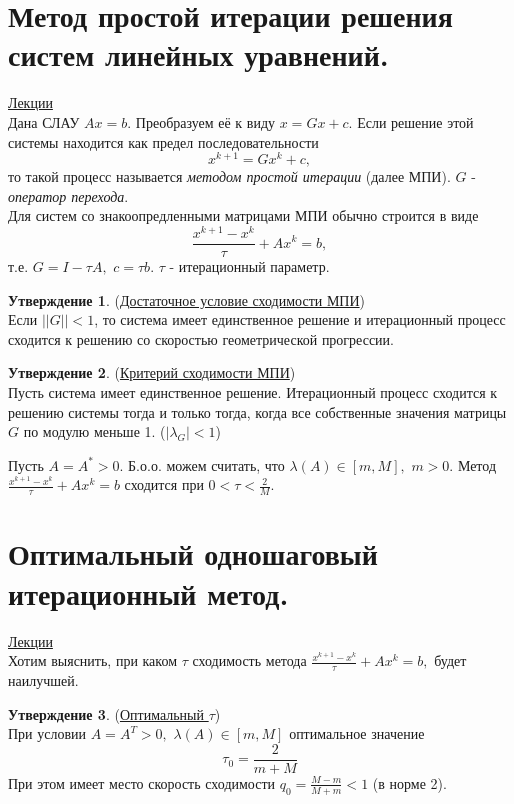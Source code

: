 \documentclass[specialist, subf, href, colorlinks=true, 12pt, times, mtpro, final]{disser}
\theoremstyle{definition}
\newtheorem{state}{Утверждение}[section]
\begin{document}
\section {Метод простой итерации решения систем линейных уравнений.}
	\hyperlink {lects.58}{Лекции}\\
	Дана СЛАУ $Ax = b$. Преобразуем её к виду $x = Gx + c$. Если решение этой системы находится как предел последовательности
	$$
	    x^{k+1} = Gx^{k} + c,
	$$
	то такой процесс называется {\it методом простой итерации} (далее МПИ). $G$ - {\it оператор перехода}.\\
	Для систем со знакоопредленными матрицами МПИ обычно строится в виде
	$$
	    \frac{x^{k+1} - x^{k}}{\tau} + Ax^{k} = b,
	$$
	т.е. $G = I - \tau A, \,\, c = \tau b$. $\tau$ - итерационный параметр.
	\begin{state} (\hyperlink {lects.58}{Достаточное условие сходимости МПИ})\\
	Если $||G|| < 1$, то система имеет единственное решение и итерационный процесс сходится
	к решению со скоростью геометрической прогрессии.
	\end{state}
    \begin{state} (\hyperlink {lects.59}{Критерий сходимости МПИ})\\
    Пусть система имеет единственное решение. Итерационный процесс сходится к решению системы тогда и только тогда, когда все собственные значения матрицы $G$ по модулю меньше 1. ($|\lambda_{G}| < 1$)
    \end{state}
    Пусть $A = A^* > 0$. Б.о.о. можем считать, что $\lambda(A) \in [m, M],\,\, m > 0$.
    Метод $ \frac{x^{k+1} - x^{k}}{\tau} + Ax^{k} = b$ сходится при $0 < \tau < \frac{2}{M}$.

\newpage
\section {Оптимальный одношаговый итерационный метод.}
	\hyperlink {lects.60}{Лекции}\\
	Хотим выяснить, при каком $\tau$ сходимость метода
	$\frac{x^{k+1} - x^{k}}{\tau} + Ax^{k} = b,$ будет наилучшей.
	\begin{state} (\hyperlink {lects.60}{Оптимальный $\tau$})\\
	При условии $A = A^T > 0, \,\, \lambda(A) \in [m, M]$ оптимальное значение
	$$\tau_0 = \frac{2}{m+M}$$
	При этом имеет место скорость сходимости $q_0 = \frac{M-m}{M+m} < 1$ (в норме 2).
	\end{state}
\end{document}
